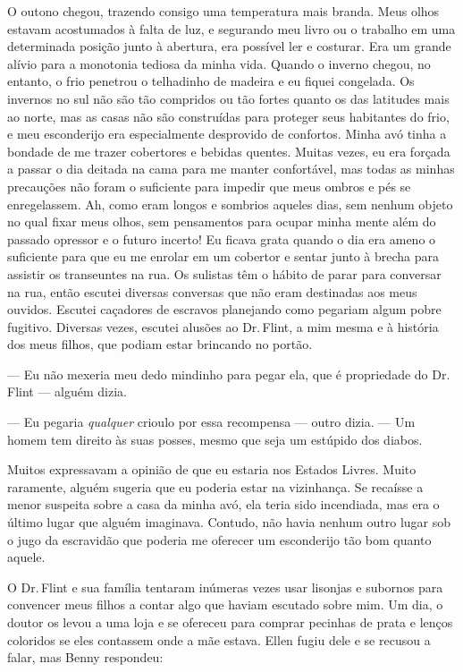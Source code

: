 O outono chegou, trazendo consigo uma
temperatura mais branda. Meus olhos estavam acostumados à falta de luz,
e segurando meu livro ou o trabalho em uma determinada posição junto à
abertura, era possível ler e costurar. Era um grande alívio para a
monotonia tediosa da minha vida. Quando o inverno chegou, no entanto, o
frio penetrou o telhadinho de madeira e eu fiquei congelada. Os invernos
no sul não são tão compridos ou tão fortes quanto os das latitudes mais
ao norte, mas as casas não são construídas para proteger seus habitantes
do frio, e meu esconderijo era especialmente desprovido de confortos.
Minha avó tinha a bondade de me trazer cobertores e bebidas quentes.
Muitas vezes, eu era forçada a passar o dia deitada na cama para me
manter confortável, mas todas as minhas precauções não foram o
suficiente para impedir que meus ombros e pés se enregelassem. Ah, como
eram longos e sombrios aqueles dias, sem nenhum objeto no qual fixar
meus olhos, sem pensamentos para ocupar minha mente além do passado
opressor e o futuro incerto! Eu ficava grata quando o dia era ameno o
suficiente para que eu me enrolar em um cobertor e sentar junto à brecha
para assistir os transeuntes na rua. Os sulistas têm o hábito de parar
para conversar na rua, então escutei diversas conversas que não eram
destinadas aos meus ouvidos. Escutei caçadores de escravos planejando
como pegariam algum pobre fugitivo. Diversas vezes, escutei alusões ao
Dr.\,Flint, a mim mesma e à história dos meus filhos, que podiam estar
brincando no portão.

--- Eu não mexeria meu dedo mindinho para pegar ela, que é propriedade
do Dr.\,Flint --- alguém dizia.

--- Eu pegaria \emph{qualquer} crioulo por essa recompensa --- outro
dizia. --- Um homem tem direito às suas posses, mesmo que seja um
estúpido dos diabos.

Muitos expressavam a opinião de que eu estaria nos Estados Livres. Muito
raramente, alguém sugeria que eu poderia estar na vizinhança. Se
recaísse a menor suspeita sobre a casa da minha avó, ela teria sido
incendiada, mas era o último lugar que alguém imaginava. Contudo, não
havia nenhum outro lugar sob o jugo da escravidão que poderia me
oferecer um esconderijo tão bom quanto aquele.

O Dr.\,Flint e sua família tentaram
inúmeras vezes usar lisonjas e subornos para convencer meus filhos a
contar algo que haviam escutado sobre mim. Um dia, o doutor os levou a
uma loja e se ofereceu para comprar pecinhas de prata e lenços coloridos
se eles contassem onde a mãe estava. Ellen fugiu dele e se recusou a
falar, mas Benny respondeu:

